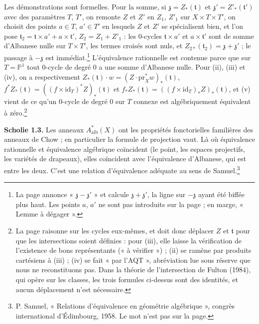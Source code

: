 \documentclass[11pt,a4paper]{article}
\begin{document}
Les démonstrations sont formelles. Pour la somme, si $\mathfrak{z} =
Z_{*}(\mathfrak{t})$ et $\mathfrak{z}' = Z'_{*}(\mathfrak{t}')$ avec des
paramètres $T$, $T'$, on remonte $Z$ et $Z'$ en $Z_{1}$, $Z'_{1}$ sur $X \times
T \times T'$, on choisit des points $a \in T$, $a' \in T'$ en lesquels $Z$ et
$Z'$ se spécialisent bien, et l'on pose $\mathfrak{t}_{2} = \mathfrak{t} \times
a' + a \times \mathfrak{t}'$, $Z_{2} = Z_{1} + Z'_{1}$ : les $0$-cycles
$\mathfrak{t} \times a'$ et $a \times \mathfrak{t}'$ sont de somme d'Albanese
nulle sur $T \times T'$, les termes croisés sont nuls, et $Z_{2*}(\mathfrak{t}_{2})
= \mathfrak{z} + \mathfrak{z}'$ ; le passage à $-\mathfrak{z}$ est
immédiat.\footnote{La page annonce « $\mathfrak{z} - \mathfrak{z}'$ » et
calcule $\mathfrak{z} + \mathfrak{z}'$, la ligne sur $-\mathfrak{z}$ ayant été
biffée plus haut. Les points $a$, $a'$ ne sont pas introduits sur la page ; en
marge, « Lemme à dégager ».} L'équivalence rationnelle est contenue parce que
sur $T = \mathbb{P}^{1}$ tout $0$-cycle de degré $0$ a une somme d'Albanese
nulle. Pour (ii), (iii) et (iv), on a respectivement $Z_{*}(\mathfrak{t}) \cdot
w = (Z \cdot \mathrm{pr}_{X}^{*}w)_{*}(\mathfrak{t})$, $f^{*}Z_{*}(\mathfrak{t})
= ((f \times \mathrm{id}_{T})^{*}Z)_{*}(\mathfrak{t})$ et
$f_{*}Z_{*}(\mathfrak{t}) = ((f \times \mathrm{id}_{T})_{*}Z)_{*}(\mathfrak{t})$,
et (v) vient de ce qu'un $0$-cycle de degré $0$ sur $T$ connexe est
algébriquement équivalent à zéro.\footnote{La page raisonne sur les cycles
eux-mêmes, et doit donc déplacer $Z$ et $\mathfrak{t}$ pour que les
intersections soient définies : pour (iii), elle laisse la vérification de
l'existence de bons représentants (« à vérifier ») ; (ii) se ramène par
produits cartésiens à (iii) ; (iv) se fait « par l'AQT », abréviation lue
sous réserve que nous ne reconstituons pas. Dans la théorie de l'intersection
de Fulton (1984), qui opère sur les classes, les trois formules ci-dessus sont
des identités, et aucun déplacement n'est nécessaire.}

\textbf{Scholie 1.3.} Les anneaux $A^{*}_{\mathrm{alb}}(X)$ ont les propriétés
fonctorielles familières des anneaux de Chow ; en particulier la formule de
projection vaut. Là où équivalence rationnelle et équivalence algébrique
coïncident (le point, les espaces projectifs, les variétés de drapeaux),
elles coïncident avec l'équivalence d'Albanese, qui est entre les deux. C'est
une relation d'équivalence adéquate au sens de Samuel.\footnote{P. Samuel,
« Relations d'équivalence en géométrie algébrique », congrès international
d'Édimbourg, 1958. Le mot n'est pas sur la page.}
\end{document}
